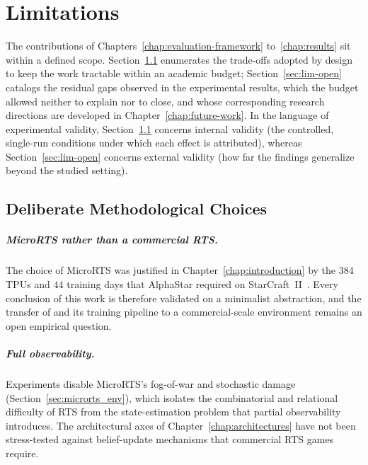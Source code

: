 \chapter{Limitations}
\label{chap:limitations}

The contributions of Chapters~\ref{chap:evaluation-framework} to~\ref{chap:results} sit within a defined scope. Section~\ref{sec:lim-deliberate} enumerates the trade-offs adopted by design to keep the work tractable within an academic budget; Section~\ref{sec:lim-open} catalogs the residual gaps observed in the experimental results, which the budget allowed neither to explain nor to close, and whose corresponding research directions are developed in Chapter~\ref{chap:future-work}. In the language of experimental validity, Section~\ref{sec:lim-deliberate} concerns internal validity (the controlled, single-run conditions under which each effect is attributed), whereas Section~\ref{sec:lim-open} concerns external validity (how far the findings generalize beyond the studied setting).

\section{Deliberate Methodological Choices}
\label{sec:lim-deliberate}

\paragraph*{MicroRTS rather than a commercial RTS.}
The choice of MicroRTS was justified in Chapter~\ref{chap:introduction} by the $384$ TPUs and $44$ training days that AlphaStar required on StarCraft~II~\cite{vinyalsGrandmasterLevelStarCraft2019}. Every conclusion of this work is therefore validated on a minimalist abstraction, and the transfer of  and its training pipeline to a commercial-scale environment remains an open empirical question.

\paragraph*{Full observability.}
Experiments disable MicroRTS's fog-of-war and stochastic damage (Section~\ref{sec:microrts_env}), which isolates the combinatorial and relational difficulty of RTS from the state-estimation problem that partial observability introduces. The architectural axes of Chapter~\ref{chap:architectures} have not been stress-tested against belief-update mechanisms that commercial RTS games require.

